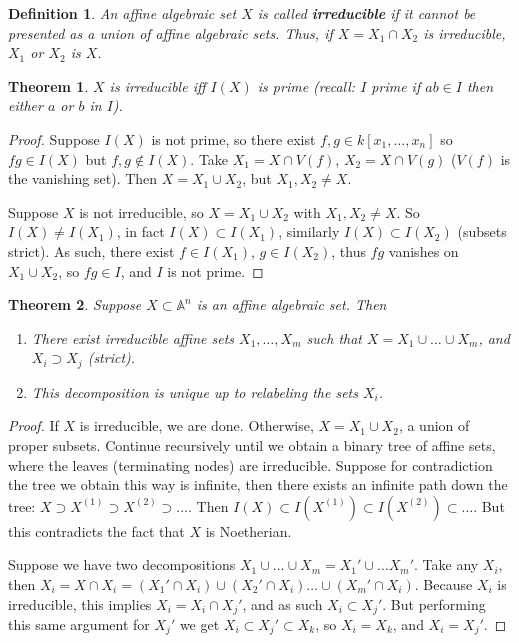 \documentclass[12pt]{article}
\newcommand{\A}{\mathbb{A}}
\newtheorem{definition}{Definition}
\newtheorem{theorem}{Theorem}
\begin{document}
    \begin{definition}
        An affine algebraic set $X$ is called \textbf{irreducible} if it cannot be presented as a union of affine algebraic sets. Thus, if $X = X_1 \cap X_2$ is irreducible, $X_1$ or $X_2$ is $X$. 
    \end{definition}
    \begin{theorem}
        $X$ is irreducible iff $I(X)$ is prime (recall: $I$ prime if $ab \in I$ then either $a$ or $b$ in $I$). 
    \end{theorem}
    \begin{proof}
        Suppose $I(X)$ is not prime, so there exist $f, g \in k[x_1, \dots, x_n]$ so $fg \in I(X)$ but $f, g \not \in I(X)$. Take $X_1 = X \cap V(f)$, $X_2 = X \cap V(g)$ ($V(f)$ is the vanishing set). Then $X = X_1 \cup X_2$, but $X_1, X_2 \neq X$. \par 
        Suppose $X$ is not irreducible, so $X = X_1 \cup X_2$ with $X_1, X_2 \neq X$. So $I(X) \neq I(X_1)$, in fact $I(X) \subset I(X_1)$, similarly $I(X) \subset I(X_2)$ (subsets strict). As such, there exist $f \in I(X_1)$, $g \in I(X_2)$, thus $fg$ vanishes on $X_1 \cup X_2$, so $fg \in I$, and $I$ is not prime. 
    \end{proof}
    \begin{theorem}
        Suppose $X \subset \A^n$ is an affine algebraic set. Then
        \begin{enumerate}
            \item There exist irreducible affine sets $X_1, \dots, X_m$ such that $X = X_1 \cup \dots \cup X_m$, and $X_i \supset X_j$ (strict). 
            \item This decomposition is unique up to relabeling the sets $X_i$. 
        \end{enumerate} 
    \end{theorem}
    \begin{proof}
        If $X$ is irreducible, we are done. Otherwise, $X = X_1 \cup X_2$, a union of proper subsets. Continue recursively until we obtain a binary tree of affine sets, where the leaves (terminating nodes) are irreducible. Suppose for contradiction the tree we obtain this way is infinite, then there exists an infinite path down the tree: $X \supset X^{(1)} \supset X^{(2)} \supset \dots $. Then $I(X) \subset I(X^{(1)}) \subset I(X^{(2)}) \subset \dots $. But this contradicts the fact that $X$ is Noetherian. \par 
        Suppose we have two decompositions $X_1 \cup \dots \cup X_m = X_1' \cup \dots X_m'$. Take any $X_i$, then $X_i = X \cap X_i = (X_1' \cap X_i) \cup (X_2' \cap X_i) \dots \cup (X_m' \cap X_i)$. Because $X_i$ is irreducible, this implies $X_i = X_i \cap X_j'$, and as such $X_i \subset X_j'$. But performing this same argument for $X_j'$ we get $X_i \subset X_j' \subset X_k$, so $X_i = X_k$, and $X_i = X_j'$. 
    \end{proof}
\end{document}
